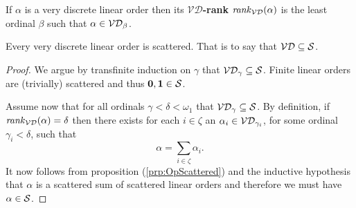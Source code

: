 \begin{dfn}[$\VD$-rank]
        If $\alpha$ is a very discrete linear order then its $\bm{\mathcal{VD}}$\textbf{-rank} $\vdrank(\alpha)$ is the least ordinal $\beta$ such that $\alpha\in\mathcal{VD}_{\beta}$.
\end{dfn}

\begin{lem}\label{prp:vdsct}
	Every very discrete linear order is scattered.  That is to say that $\mathcal{VD}\subseteq\mathcal{S}$.
\end{lem}
\begin{proof}
	We argue by transfinite induction on $\gamma$ that $\mathcal{VD}_\gamma\subseteq\mathcal{S}$.  Finite linear orders are (trivially) scattered and thus $\mathbf{0},\mathbf{1}\in\mathcal{S}$.

	Assume now that for all ordinals $\gamma<\delta<\omega_1$ that $\mathcal{VD}_\gamma\subseteq\mathcal{S}$.  By definition, if $\mathit{rank}_\mathcal{VD}(\alpha)=\delta$ then there exists for each $i\in\zeta$ an $\alpha_i\in\VD_{\gamma_i}$, for some ordinal $\gamma_i<\delta$, such that
	\begin{equation}
		\alpha=\sum_{i\in\zeta}\alpha_i.
	\end{equation}
	It now follows from proposition (\ref{prp:OpScattered}) and the inductive hypothesis that $\alpha$ is a scattered sum of scattered linear orders and therefore we must have $\alpha\in\mathcal{S}$.
\end{proof}

\iffalse\begin{lem}
        If $\alpha\in\VD$ and $\beta\subseteq\alpha$ is convex in $\alpha$ then $\beta\in\VD$.
\end{lem}

\begin{proof}
	 We argue by induction on  $\vdrank(\alpha)$.  The case $\vdrank(\alpha)=0$ is trivial so suppose that $\beta\subseteq\alpha$ and $\beta$ convex in $\alpha$ imply $\beta\in\VD$ whenever $\vdrank(\alpha)<\gamma<\omega_1$.  Suppose now that $\vdrank(\alpha)=\gamma$ and $\beta\subseteq\alpha$ is convex in $\alpha$.  By definition, for each $i\in\zeta$ there must exist $\alpha_i\in\VD_{\gamma_i}$, for some $\gamma_i<\gamma$, such that
	\begin{equation}
	    \alpha=\sum_{i\in\zeta}\alpha_i.
	\end{equation}
	Now define $\beta_i=\beta\cap\alpha_i$ for each $i\in I$.  For each $i\in\zeta$, since $\beta_i$ is convex in $\alpha_i$ and $\vdrank(\alpha_i)<\gamma$, it follows that $\beta_i\in\VD$.  However, note that
	\begin{equation}
	    \beta=\sum_{i\in\zeta}\beta_i.
	\end{equation}
	Therefore, by definition of $\VD$ it follows that $\beta\in\VD$.
\end{proof}\fi

